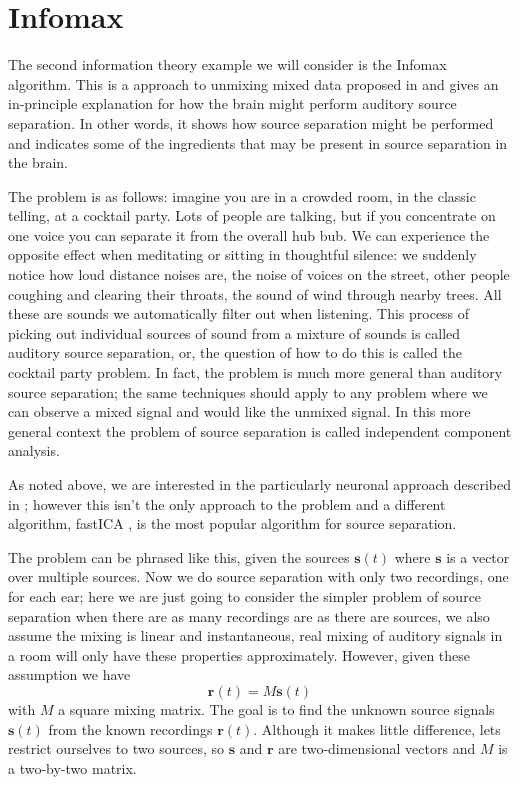 \documentclass[12pt]{article}
\begin{document}
\section*{Infomax}

The second information theory example we will consider is the Infomax
algorithm. This is a approach to unmixing mixed data proposed in
\cite{BellSejnowski1995} and gives an in-principle explanation for how
the brain might perform auditory source separation. In other words, it
shows how source separation might be performed and indicates some of
the ingredients that may be present in source separation in the brain.

The problem is as follows: imagine you are in a crowded room, in the
classic telling, at a cocktail party. Lots of people are talking, but
if you concentrate on one voice you can separate it from the overall
hub bub. We can experience the opposite effect when meditating or
sitting in thoughtful silence: we suddenly notice how loud distance
noises are, the noise of voices on the street, other people coughing
and clearing their throats, the sound of wind through nearby
trees. All these are sounds we automatically filter out when
listening. This process of picking out individual sources of sound
from a mixture of sounds is called auditory source separation, or, the
question of how to do this is called the cocktail party problem. In
fact, the problem is much more general than auditory source
separation; the same techniques should apply to any problem where we
can observe a mixed signal and would like the unmixed signal. In this
more general context the problem of source separation is called
independent component analysis.

As noted above, we are interested in the particularly neuronal
approach described in \cite{BellSejnowski1995}; however this isn't the
only approach to the problem and a different algorithm, fastICA
\citep{Hyvarinen1999}, is the most popular algorithm for source separation.

The problem can be phrased like this, given the sources
$\textbf{s}(t)$ where $\textbf{s}$ is a vector over multiple
sources. Now we do source separation with only two recordings, one for
each ear; here we are just going to consider the simpler problem of
source separation when there are as many recordings are as there are
sources, we also assume the mixing is linear and instantaneous, real
mixing of auditory signals in a room will only have these properties
approximately. However, given these assumption we have
\begin{equation} \mathbf{r}(t)=M\mathbf{s}(t) \end{equation} with $M$
a square mixing matrix. The goal is to find the unknown source signals
$\textbf{s}(t)$ from the known recordings $\textbf{r}(t)$. Although it
makes little difference, lets restrict ourselves to two sources, so
$\mathbf{s}$ and $\mathbf{r}$ are two-dimensional vectors and $M$ is a
two-by-two matrix.
\end{document}
